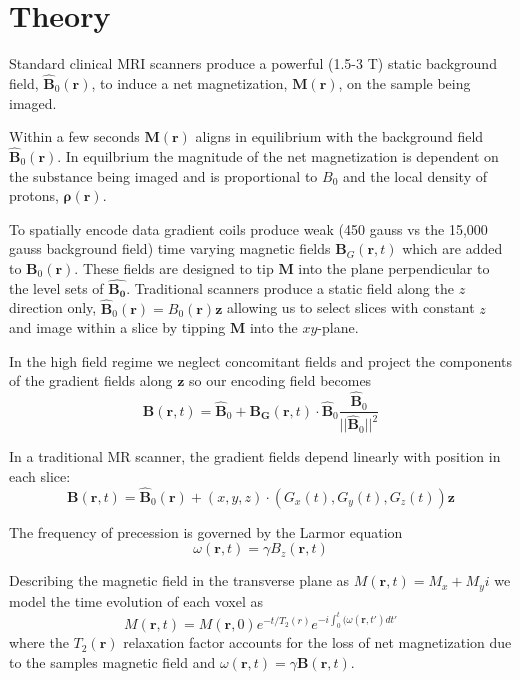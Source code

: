 \documentclass[11pt]{amsart}
\theoremstyle{remark}
\begin{document}
\section{Theory}

Standard clinical MRI scanners produce a powerful (1.5-3 T) static background field, $\mathbf{\hat{B}}_0(\mathbf{r})$,
to induce a net magnetization, $\mathbf{M(\mathbf{r})}$, on the sample being imaged.

Within a few seconds $\mathbf{M}(\mathbf{r})$ aligns in equilibrium with
the background field $\mathbf{\hat{B}}_0(\mathbf{r})$. In equilbrium the
magnitude of the net magnetization is dependent on the substance being
imaged and is proportional to $B_0$ and the local density of protons, $\mathbf{\rho}(\mathbf{r})$.


To spatially encode data gradient coils produce weak (450 gauss vs the
15,000 gauss background field) time varying magnetic fields
$\mathbf{B}_G(\mathbf{r},t)$ which are added to
$\mathbf{B}_0(\mathbf{r})$. These fields are designed to tip
$\mathbf{M}$ into the plane perpendicular to the level sets of
$\mathbf{\hat{B_0}}$. Traditional scanners produce a static field along
the $z$ direction only, $\mathbf{\hat{B}}_0(\mathbf{r}) =
B_0(\mathbf{r})\mathbf{z}$ allowing us to select slices with
constant $z$ and image within a slice by tipping
$\mathbf{M}$ into the $xy$-plane.


In the high field regime \cite{Kelso2009} we neglect concomitant fields and project the components of the gradient fields along $\mathbf{z}$ so our encoding field becomes
\begin{equation}
\mathbf{B}(\mathbf{r},t) = \mathbf{\hat{B}}_0 + \mathbf{B_G}(\mathbf{r},t)\cdot \mathbf{\hat{B}}_0 \frac{\mathbf{\hat{B}}_0}{||\mathbf{\hat{B}}_0||^2}
\end{equation}


In a traditional MR scanner, the gradient fields depend linearly with position in each slice:
\begin{equation}
\mathbf{B}(\mathbf{r},t) = \mathbf{\hat{B}}_0(\mathbf{r}) + (x,y,z)\cdot(G_x(t),G_y(t),G_z(t))\mathbf{z}
\end{equation}


The frequency of precession is governed by the Larmor equation
\begin{equation}
\omega(\mathbf{r},t) = \gamma B_z(\mathbf{r},t)
\end{equation}

Describing the magnetic field in the transverse plane as $M(\mathbf{r},t) = M_x + M_yi$ we model the time evolution of each voxel as
\begin{equation}
M(\mathbf{r},t) = M(\mathbf{r},0) e^{-t/T_2(r)}e^{-i\int_0^t(\omega(\mathbf{r},t')dt'}
\end{equation} 
where the $T_2(\mathbf{r})$ relaxation factor accounts for the loss of net magnetization due to the samples magnetic field and $\omega(\mathbf{r},t) = \gamma \mathbf{B}(\mathbf{r},t)$.
\end{document}
